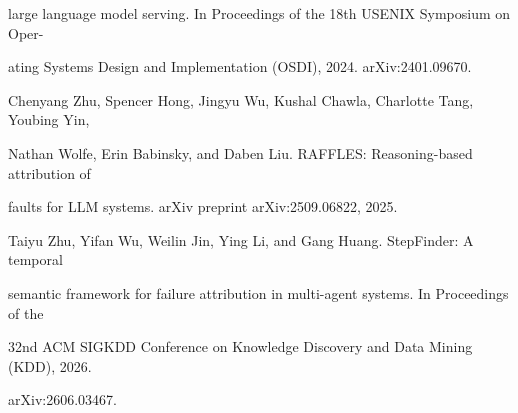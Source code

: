 \begin{flushleft}
\noindent  large language model serving. In Proceedings of the 18th USENIX Symposium on Oper-\par
\noindent  ating Systems Design and Implementation (OSDI), 2024. arXiv:2401.09670.\par
\par\smallskip
\noindent [51] Chenyang Zhu, Spencer Hong, Jingyu Wu, Kushal Chawla, Charlotte Tang, Youbing Yin,\par
\noindent  Nathan Wolfe, Erin Babinsky, and Daben Liu. RAFFLES: Reasoning-based attribution of\par
\noindent  faults for LLM systems. arXiv preprint arXiv:2509.06822, 2025.\par
\par\smallskip
\noindent [52] Taiyu Zhu, Yifan Wu, Weilin Jin, Ying Li, and Gang Huang. StepFinder: A temporal\par
\noindent  semantic framework for failure attribution in multi-agent systems. In Proceedings of the\par
\noindent  32nd ACM SIGKDD Conference on Knowledge Discovery and Data Mining (KDD), 2026.\par
\noindent  arXiv:2606.03467.\par
\end{flushleft}
